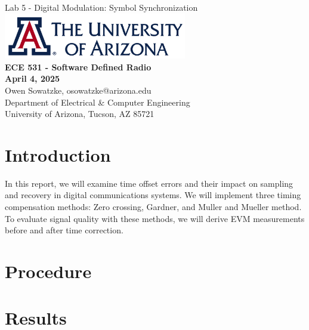 \documentclass{article}
\begin{document}
\begin{titlepage}
	\centering
	{\huge Lab 5 - Digital Modulation: Symbol Synchronization}\\[0.25 in]
	\includegraphics[width=0.6\textwidth]{ua_logo.png}\\[0.25 in]
	{\large \textbf{ECE 531 - Software Defined Radio\\[0.25 in]
	April 4, 2025\\[0.25 in]}}
	{\large Owen Sowatzke, osowatzke@arizona.edu\\[0.05 in]
	Department of Electrical \& Computer Engineering\\[0.05 in]
	University of Arizona, Tucson, AZ 85721\\[0.5 in]}
	\hypersetup{linkcolor=navy-blue}
	\noindent\hrulefill
	\tableofcontents
	\noindent\hrulefill
\end{titlepage}


\section{Introduction}
In this report, we will examine time offset errors and their impact on sampling and recovery in digital communications systems. We will implement three timing compensation methods: Zero crossing, Gardner, and Muller and Mueller method. To evaluate signal quality with these methods, we will derive EVM measurements before and after time correction. 


\section{Procedure}

\section{Results}
\end{document}
